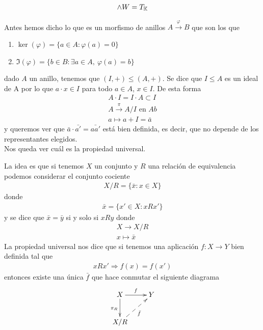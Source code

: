 \begin{gather*}
    \wedge W = T_{\mathbb{K}} 
\end{gather*}

Antes hemos dicho lo que es un morfismo de anillos $A \overset{\varphi}{\to} B$ que son los que 
\begin{enumerate}
    \item $\ker(\varphi) = \{a \in A : \varphi(a) = 0\}$
    \item $\Im(\varphi) = \{b\in B : \exists a \in A,\ \varphi(a) = b\}$
\end{enumerate}
dado $A$ un anillo, tenemos que $(I,+) \leq (A,+)$. Se dice que $I\leq A$ es un ideal de A por lo que $a\cdot x \in I$ para todo $a\in A$, $x\in I$. De esta forma
\begin{gather*}
    A \cdot I = I \cdot A \subset I\\
    A \overset{\pi}{\to} A/I \text{ en } Ab\\
    a \mapsto a + I = \bar{a}
\end{gather*}
y queremos ver que $\bar{a} \cdot \bar{a'} = \bar{aa'}$ está bien definida, es decir, que no depende de los representantes elegidos. \\

Nos queda ver cuál es la propiedad universal. 

La idea es que si tenemos $X$ un conjunto y $R$ una relación de equivalencia podemos considerar el conjunto cociente
\begin{gather*}
    X/R = \{\bar{x} : x\in X\}
\end{gather*}
donde
\begin{gather*}
    \bar{x} = \{x'\in X : xRx'\}
\end{gather*}
y se dice que $\bar{x} = \bar{y}$ si y solo si $xRy$ donde
\begin{gather*}
    X \to X/R \\
    x \mapsto \bar{x}
\end{gather*}
La propiedad universal nos dice que si tenemos una aplicación $f:X\to Y$ bien definida tal que 
\begin{gather*}
    xRx' \Rightarrow f(x)=f(x')
\end{gather*}
entonces existe una única $\bar{f}$ que hace conmutar el siguiente diagrama
\begin{gather*}
    \xymatrix{
        X \ar[d]_{\pi_R} \ar[r]^f & Y\\
        X/R \ar@{-->}[ur]_{\bar{f}}
    }
\end{gather*}


